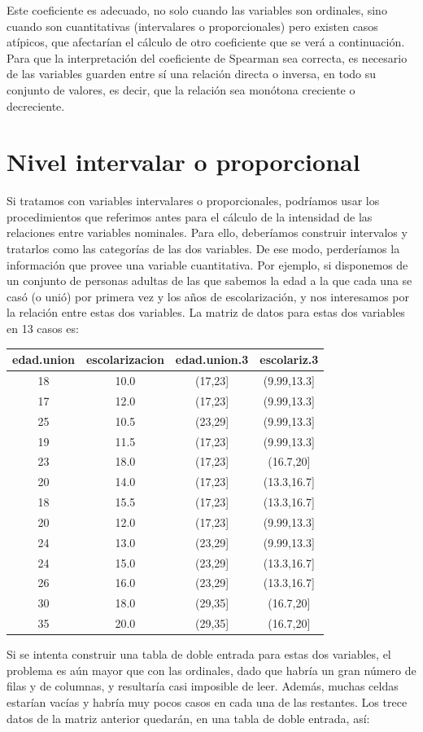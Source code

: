 \documentclass[]{book}
\begin{document}
Este coeficiente es adecuado, no solo cuando las variables son ordinales, sino cuando son cuantitativas (intervalares o proporcionales) pero existen casos atípicos, que afectarían el cálculo de otro coeficiente que se verá a continuación. Para que la interpretación del coeficiente de Spearman sea correcta, es necesario de las variables guarden entre sí una relación directa o inversa, en todo su conjunto de valores, es decir, que la relación sea monótona creciente o decreciente.

\hypertarget{nivel-intervalar-o-proporcional}{%
\section{Nivel intervalar o proporcional}\label{nivel-intervalar-o-proporcional}}

Si tratamos con variables intervalares o proporcionales, podríamos usar los procedimientos que referimos antes para el cálculo de la intensidad de las relaciones entre variables nominales. Para ello, deberíamos construir intervalos y tratarlos como las categorías de las dos variables. De ese modo, perderíamos la información que provee una variable cuantitativa. Por ejemplo, si disponemos de un conjunto de personas adultas de las que sabemos la edad a la que cada una se casó (o unió) por primera vez y los años de escolarización, y nos interesamos por la relación entre estas dos variables. La matriz de datos para estas dos variables en 13 casos es:

\begin{longtable}[]{@{}cccc@{}}
\toprule
edad.union & escolarizacion & edad.union.3 & escolariz.3\tabularnewline
\midrule
\endhead
18 & 10.0 & (17,23{]} & (9.99,13.3{]}\tabularnewline
17 & 12.0 & (17,23{]} & (9.99,13.3{]}\tabularnewline
25 & 10.5 & (23,29{]} & (9.99,13.3{]}\tabularnewline
19 & 11.5 & (17,23{]} & (9.99,13.3{]}\tabularnewline
23 & 18.0 & (17,23{]} & (16.7,20{]}\tabularnewline
20 & 14.0 & (17,23{]} & (13.3,16.7{]}\tabularnewline
18 & 15.5 & (17,23{]} & (13.3,16.7{]}\tabularnewline
20 & 12.0 & (17,23{]} & (9.99,13.3{]}\tabularnewline
24 & 13.0 & (23,29{]} & (9.99,13.3{]}\tabularnewline
24 & 15.0 & (23,29{]} & (13.3,16.7{]}\tabularnewline
26 & 16.0 & (23,29{]} & (13.3,16.7{]}\tabularnewline
30 & 18.0 & (29,35{]} & (16.7,20{]}\tabularnewline
35 & 20.0 & (29,35{]} & (16.7,20{]}\tabularnewline
\bottomrule
\end{longtable}

Si se intenta construir una tabla de doble entrada para estas dos variables, el problema es aún mayor que con las ordinales, dado que habría un gran número de filas y de columnas, y resultaría casi imposible de leer. Además, muchas celdas estarían vacías y habría muy pocos casos en cada una de las restantes. Los trece datos de la matriz anterior quedarán, en una tabla de doble entrada, así:
\end{document}
